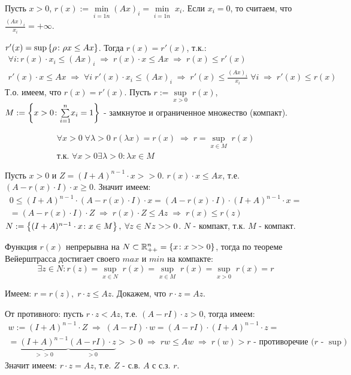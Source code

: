 \begin{Proof}
	Пусть $x > 0$, $r(x) := \underset{i = \overline{1 n}}{\min} (A x)_i = \underset{i = \overline{1 n}}{\min} \; x_i$. Если $x_i = 0$, то считаем, что $\frac{(A x)_i}{x_i} = +\infty$.

	$r'(x) = \sup \left\{\rho\colon\rho x \le A x\right\}$. Тогда $r(x) = r'(x)$, т.к.:
	$$\begin{gathered}
		\forall i: r(x) \cdot x_i \le (A x)_i \; \Rightarrow \; r(x) \cdot x \le A x \; \Rightarrow \; r(x) \le r'(x) \\
		r'(x) \cdot x \le A x \; \Rightarrow \; \forall i \; r'(x) \cdot x_i \le (A x)_i \; \Rightarrow \; r'(x) \le \frac{(A x)_i}{x_i} \; \forall i \; \Rightarrow \; r'(x) \le r(x)
	\end{gathered}$$
	Т.о. имеем, что $r(x) = r'(x)$. Пусть $r := \underset{x > 0}{\sup} \; r(x)$, $M := \left\{x > 0\colon\underset{i=1}{\overset{n}{\sum}}x_i = 1\right\}$ - замкнутое и ограниченное множество (компакт).

	$$\begin{gathered}
		\forall x >0 \; \forall \lambda > 0 \; r (\lambda x) = r(x) \; \Rightarrow \; r = \underset{x \in M}{\sup} \; r(x) \\
		\text{т.к. } \forall x > 0 \exists \lambda > 0: \lambda x \in M
	\end{gathered}$$

	Пусть $x > 0$ и $Z = (I+A)^{n-1} \cdot x >> 0$. $r(x) \cdot x \le A x$, т.е. $(A - r(x) \cdot I) \cdot x \ge 0$. Значит имеем:
	$$\begin{gathered}
		0 \le (I+A)^{n-1} \cdot (A - r(x) \cdot I) \cdot x = (A - r(x) \cdot I) \cdot (I + A)^{n-1} \cdot x = \\
		= (A - r(x) \cdot I) \cdot Z \; \Rightarrow  \; r(x) \cdot Z \le A z \; \Rightarrow \; r(x) \le r(z)
	\end{gathered}$$
	$N:= \left\{(I+A)^{n-1} \cdot x\colon x \in M\right\}, \; \forall z \in N z >> 0$. $N$ - компакт, т.к. $M$ - компакт.

	Функция $r(x)$ непрерывна на $N \subset \mathbb{R}_{++}^{n} = \left\{x\colon x >>0\right\}$, тогда по теореме Вейерштрасса достигает своего $max$ и $min$ на компакте:
	$$\exists z \in N: r(z) = \underset{x \in N}{\sup} \; r(x) = \underset{x \in M}{\sup} \; r(x) = \underset{x > 0}{\sup} \; r(x) = r$$

	Имеем: $r = r(z), \; r \cdot z \le A z$. Докажем, что $r \cdot z = A z$. 

	От противного: пусть $r \cdot z < A z$, т.е. $(A - r I)\cdot z > 0$, тогда имеем:
	$$\begin{gathered}
		w := (I+A)^{n-1} \cdot Z \; \Rightarrow \; (A - r I)\cdot w = (A -r I) \cdot (I+A)^{n-1} \cdot z = \\
		= \underbrace{(I+A)^{n-1}}_{>>0} \underbrace{(A -r I) \cdot z}_{>0} >> 0 \; \Rightarrow \; r w \le A w \; \Rightarrow \;  r(w) > r \text{ - противоречие (} r \text{ - } \sup \text{)}
	\end{gathered}$$
	Значит имеем: $r\cdot z = A z$, т.е. $Z$ - с.в. $A$  с с.з. $r$.\\


\end{Proof}
